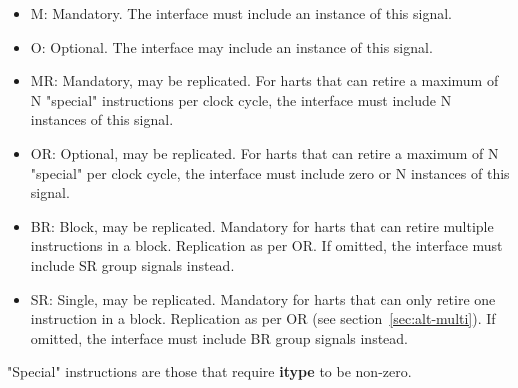 \begin{itemize}
  \item M: Mandatory.  The interface must include an instance of this signal.
  \item O: Optional.  The interface may include an instance of this signal.
  \item MR: Mandatory, may be replicated. For harts that can retire a maximum of N "special" instructions per clock
    cycle, the interface must include N instances of this signal.
  \item OR: Optional, may be replicated. For harts that can retire a maximum of N "special" per clock
    cycle, the interface must include zero or N instances of this signal.
  \item BR: Block, may be replicated.  Mandatory for harts that can retire multiple instructions in a block.  
    Replication as per OR.  If omitted, the interface must include SR group signals instead.
  \item SR: Single, may be replicated.  Mandatory for harts that can only retire one instruction in a block.  
    Replication as per OR (see section~\ref{sec:alt-multi}).  If omitted, the interface must include BR 
    group signals instead.
\end{itemize}
"Special" instructions are those that require \textbf{itype} to be non-zero.

